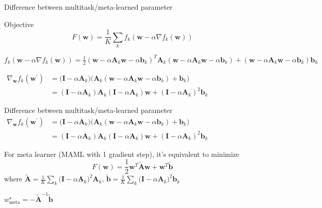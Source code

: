 \documentclass{beamer}
\begin{document}
\begin{frame}[t]{Difference between multitask/meta-learned parameter}
  \begin{block}{Objective}
  \begin{equation*}
    F(\mathbf{w}) =  \frac{1}{K} \sum_k f_k(\mathbf{w} - \alpha \nabla f_k(\mathbf{w})) 
  \end{equation*}
  \end{block}

    $f_k(\mathbf{w} - \alpha \nabla f_k (\mathbf{w})) = \frac{1}{2}(\mathbf{w} - \alpha \mathbf{A}_k \mathbf{w} - \alpha \mathbf{b}_k)^T \mathbf{A}_k (\mathbf{w} - \alpha \mathbf{A}_k \mathbf{w} - \alpha \mathbf{b}_k) + (\mathbf{w} - \alpha \mathbf{A}_k \mathbf{w} - \alpha \mathbf{b}_k) \mathbf{b}_k$
    \vspace{1em}

    $\begin{aligned}
      \nabla_\mathbf{w} f_k(\mathbf{w}^\prime) & = \big( \mathbf{I} - \alpha \mathbf{A}_k \big) \big(\mathbf{A}_k (\mathbf{w} - \alpha \mathbf{A}_k \mathbf{w}-\alpha \mathbf{b}_k) + \mathbf{b}_k \big) \\
                                               & = ( \mathbf{I} - \alpha \mathbf{A}_k ) \mathbf{A}_k ( \mathbf{I} - \alpha \mathbf{A}_k ) \mathbf{w} + (\mathbf{I} - \alpha \mathbf{A}_k)^2 \mathbf{b}_k
    \end{aligned}$
\end{frame}

\begin{frame}[t]{Difference between multitask/meta-learned parameter}
    $\begin{aligned}
      \nabla_\mathbf{w} f_k(\mathbf{w}^\prime) & = \big( \mathbf{I} - \alpha \mathbf{A}_k \big) \big(\mathbf{A}_k (\mathbf{w} - \alpha \mathbf{A}_k \mathbf{w}-\alpha \mathbf{b}_k) + \mathbf{b}_k \big) \\
                                               & = ( \mathbf{I} - \alpha \mathbf{A}_k ) \mathbf{A}_k ( \mathbf{I} - \alpha \mathbf{A}_k ) \mathbf{w} + (\mathbf{I} - \alpha \mathbf{A}_k)^2 \mathbf{b}_k
    \end{aligned}$

    \vspace{1em}

  For meta learner (MAML with 1 gradient step), it's equivalent to minimize
  \begin{equation*}
    F(\mathbf{w}) =  \frac{1}{2} \mathbf{w}^T \tilde{\mathbf{A}} \mathbf{w} + \mathbf{w}^T \tilde{\mathbf{b}}
  \end{equation*}
  where $\tilde{\mathbf{A}} = \frac{1}{K}\sum_k \big( \mathbf{I} - \alpha \mathbf{A}_k \big)^2 \mathbf{A}_k$, $\tilde{\mathbf{b}} = \frac{1}{K}\sum_k \big( \mathbf{I} - \alpha \mathbf{A}_k \big)^2\mathbf{b}_k$

  \center $\boxed{w^\star_{\text{meta}} = - \tilde{\mathbf{A}}^{-1}\tilde{\mathbf{b}}}$
\end{frame}


\end{document}
